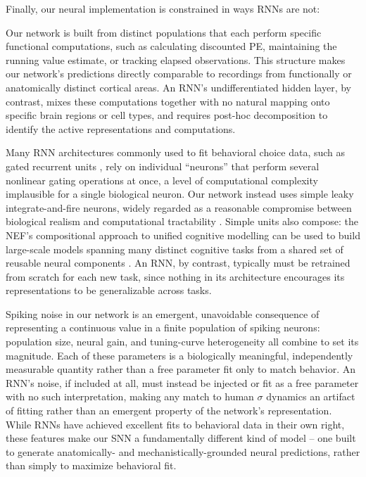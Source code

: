 Finally, our neural implementation is constrained in ways RNNs are not:

\begin{ms}
Our network is built from distinct populations that each perform specific functional computations, such as calculating discounted PE, maintaining the running value estimate, or tracking elapsed observations. This structure makes our network's predictions directly comparable to recordings from functionally or anatomically distinct cortical areas. An RNN's undifferentiated hidden layer, by contrast, mixes these computations together with no natural mapping onto specific brain regions or cell types, and requires post-hoc decomposition to identify the active representations and computations.

Many RNN architectures commonly used to fit behavioral choice data, such as gated recurrent units \citep{jian2025discovering}, rely on individual ``neurons'' that perform several nonlinear gating operations at once, a level of computational complexity implausible for a single biological neuron. Our network instead uses simple leaky integrate-and-fire neurons, widely regarded as a reasonable compromise between biological realism and computational tractability \citep{eliasmith2013build, gerstner2014neuronal, dayan2005theoretical}. Simple units also compose: the NEF's compositional approach to unified cognitive modelling can be used to build large-scale models spanning many distinct cognitive tasks from a shared set of reusable neural components \citep{choo2018spaun}. An RNN, by contrast, typically must be retrained from scratch for each new task, since nothing in its architecture encourages its representations to be generalizable across tasks.

Spiking noise in our network is an emergent, unavoidable consequence of representing a continuous value in a finite population of spiking neurons: population size, neural gain, and tuning-curve heterogeneity all combine to set its magnitude. Each of these parameters is a biologically meaningful, independently measurable quantity rather than a free parameter fit only to match behavior. An RNN's noise, if included at all, must instead be injected or fit as a free parameter with no such interpretation, making any match to human $\sigma$ dynamics an artifact of fitting rather than an emergent property of the network's representation. While RNNs have achieved excellent fits to behavioral data in their own right, these features make our SNN a fundamentally different kind of model -- one built to generate anatomically- and mechanistically-grounded neural predictions, rather than simply to maximize behavioral fit.
\end{ms}

